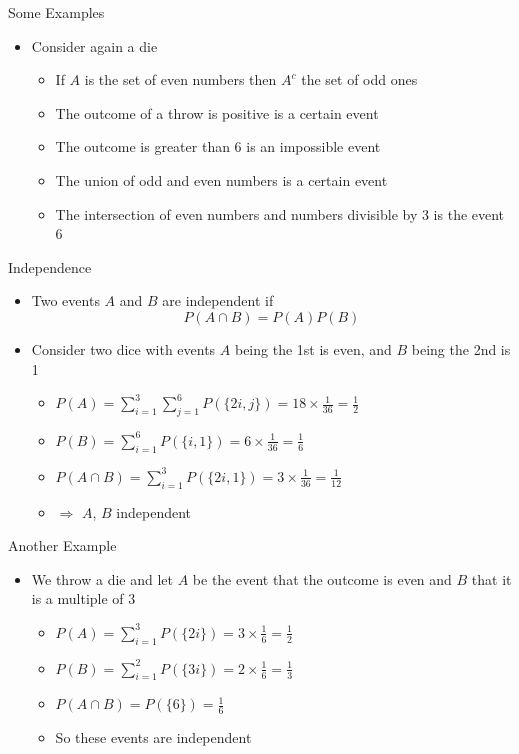 \documentclass{beamer}
\begin{document}
\begin{frame}{Some Examples} 
\begin{itemize} 
 \item Consider again a die
\begin{itemize}
\item If $A$ is the set of even numbers then $A^c$ the set of odd ones
\item The outcome of a throw is positive is a certain event 
\item The outcome is greater than 6 is an impossible event 
\item The union of odd and even numbers is a certain event 
\item The intersection of even numbers and numbers divisible by 3 is the event ${6}$
\end{itemize}
 \end{itemize}
\end{frame}

\begin{frame}{Independence} 
\begin{itemize}
 \item Two events $A$ and $B$ are independent if 
\begin{displaymath} 
 P(A \cap B) = P(A)P(B)
\end{displaymath}
\item Consider two dice with events $A$ being the 1st is even, and $B$ being the 2nd is 1
\begin{itemize}
\item $P(A) = \sum_{i=1}^3 \sum_{j=1}^6 P(\{2i, j\}) = 18 \times \frac{1}{36} = \frac{1}{2}$
\item $P(B) =  \sum_{i=1}^6 P(\{i, 1\}) = 6 \times \frac{1}{36} = \frac{1}{6}$
\item $P(A \cap B) = \sum_{i=1}^3 P(\{2i, 1\}) = 3 \times \frac{1}{36}  = \frac{1}{12}$ 
\item $\Rightarrow$ $A$, $B$ independent 
\end{itemize}
\end{itemize}
\end{frame}

\begin{frame}{Another Example}  
 \begin{itemize}
  \item We throw a die and let $A$ be the event that the outcome is even and $B$ that it is a multiple of 3
\begin{itemize}
\item $P(A) = \sum_{i=1}^3 P(\{2i\}) = 3 \times \frac{1}{6} = \frac{1}{2}$ 
\item $P(B) = \sum_{i=1}^2 P(\{3i\}) = 2 \times \frac{1}{6} = \frac{1}{3}$ 
\item $P(A \cap B) = P(\{6\}) = \frac{1}{6}$ 
\item So these events are independent 
 \end{itemize}
 \end{itemize}
\end{frame}
\end{document}
